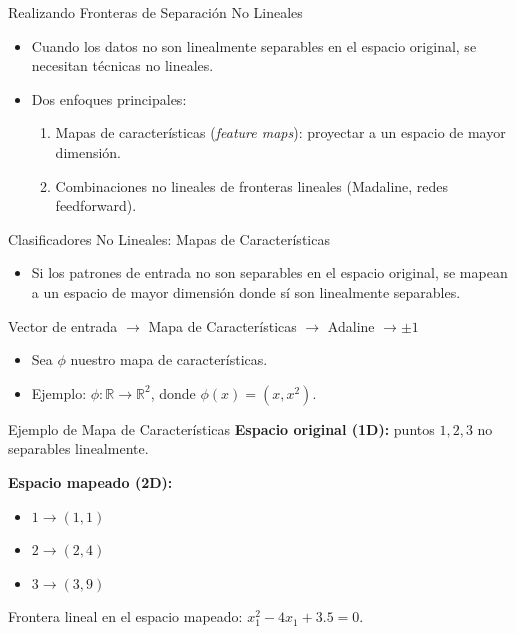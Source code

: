 \documentclass[aspectratio=169,utf8,spanish]{beamer}
\newcommand{\R}{\mathbb{R}}
\begin{document}
\begin{frame}{Realizando Fronteras de Separación No Lineales}
  \begin{itemize}
    \item Cuando los datos no son linealmente separables en el espacio original, se necesitan técnicas no lineales.
    \item Dos enfoques principales:
    \begin{enumerate}
      \item Mapas de características (\textit{feature maps}): proyectar a un espacio de mayor dimensión.
      \item Combinaciones no lineales de fronteras lineales (Madaline, redes feedforward).
    \end{enumerate}
  \end{itemize}
\end{frame}

\begin{frame}{Clasificadores No Lineales: Mapas de Características}
  \begin{itemize}
    \item Si los patrones de entrada no son separables en el espacio original, se mapean a un espacio de mayor dimensión donde sí son linealmente separables.
  \end{itemize}
  \begin{center}
    Vector de entrada $\rightarrow$ Mapa de Características $\rightarrow$ Adaline $\rightarrow \pm 1$
  \end{center}
  \begin{itemize}
    \item Sea $\phi$ nuestro mapa de características.
    \item Ejemplo: $\phi: \R \to \R^2$, donde $\phi(x) = (x, x^2)$.
  \end{itemize}
\end{frame}

\begin{frame}{Ejemplo de Mapa de Características}
  \textbf{Espacio original (1D):} puntos $1, 2, 3$ no separables linealmente.
  \bigskip

  \textbf{Espacio mapeado (2D):}
  \begin{itemize}
    \item $1 \to (1, 1)$
    \item $2 \to (2, 4)$
    \item $3 \to (3, 9)$
  \end{itemize}
  \bigskip

  Frontera lineal en el espacio mapeado: $x_1^2 - 4x_1 + 3.5 = 0$.
\end{frame}
\end{document}
